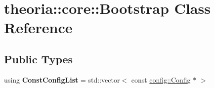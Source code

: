 \hypertarget{classtheoria_1_1core_1_1Bootstrap}{}\section{theoria\+:\+:core\+:\+:Bootstrap Class Reference}
\label{classtheoria_1_1core_1_1Bootstrap}
\subsection*{Public Types}
\begin{DoxyCompactItemize}
\item 
\mbox{\label{classtheoria_1_1core_1_1Bootstrap_a85815bda61be9829fbd359bcf572b1b8}} 
using {\bfseries Const\+Config\+List} = std\+::vector$<$ const \hyperlink{classtheoria_1_1config_1_1Config}{config\+::\+Config} $\ast$ $>$
\end{DoxyCompactItemize}
